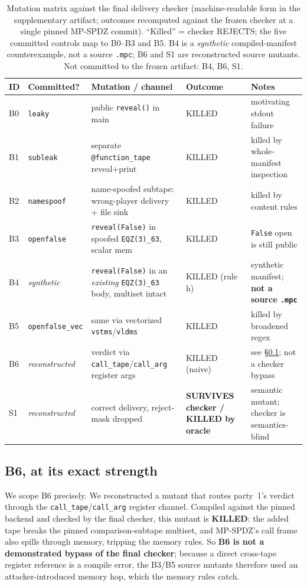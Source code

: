 \documentclass[conference]{IEEEtran}
\newcommand{\code}[1]{\texttt{\small #1}}
\newcommand{\calltape}{\code{call\_tape}}
\newcommand{\callarg}{\code{call\_arg}}
\begin{document}
\begin{table}[t]
\centering\footnotesize\renewcommand{\arraystretch}{1.25}
\caption{Mutation matrix against the final delivery checker (machine-readable form in the
supplementary artifact; outcomes recomputed against the frozen checker at a single pinned
MP-SPDZ commit). ``Killed'' = checker REJECTS; the five committed controls map to B0--B3
and B5. B4 is a \emph{synthetic} compiled-manifest counterexample, not a source
\code{.mpc}; B6 and S1 are reconstructed source mutants. Not committed to the frozen
artifact: B4, B6, S1.}
\label{tab:matrix}
\begin{tabularx}{\textwidth}{@{}l l X l X@{}}
\toprule
\textbf{ID} & \textbf{Committed?} & \textbf{Mutation / channel} & \textbf{Outcome} & \textbf{Notes} \\
\midrule
B0 & \code{leaky} & public \code{reveal()} in main & KILLED & motivating stdout failure \\
B1 & \code{subleak} & separate \code{@function\_tape} reveal+print & KILLED & killed by whole-manifest inspection \\
B2 & \code{namespoof} & name-spoofed subtape: wrong-player delivery + file sink & KILLED & killed by content rules \\
B3 & \code{openfalse} & \code{reveal(False)} in spoofed \code{EQZ(3)\_63}, scalar mem & KILLED & \code{False} open is still public \\
B4 & \emph{synthetic} & \code{reveal(False)} in an \emph{existing} \code{EQZ(3)\_63} body, multiset intact & KILLED (rule h) & synthetic manifest; \textbf{not a source \code{.mpc}} \\
B5 & \code{openfalse\_vec} & same via vectorized \code{vstms}/\code{vldms} & KILLED & killed by broadened regex \\
B6 & \emph{reconstructed} & verdict via \calltape/\callarg{} register args & KILLED (naive) & see \S\ref{sec:b6}; not a checker bypass \\
S1 & \emph{reconstructed} & correct delivery, reject-mask dropped & \textbf{SURVIVES checker / KILLED by oracle} & semantic mutant; checker is semantics-blind \\
\bottomrule
\end{tabularx}
\end{table}

\subsection{B6, at its exact strength}
\label{sec:b6}
We scope B6 precisely. We reconstructed a mutant that routes party~1's verdict through the
\calltape/\callarg{} register channel. Compiled against the pinned backend and checked by
the final checker, this mutant is \textbf{KILLED}: the added tape breaks the pinned
comparison-subtape multiset, and MP-SPDZ's call frame also spills through memory, tripping
the memory rules. So \textbf{B6 is not a demonstrated bypass of the final checker}; because
a direct cross-tape register reference is a compile error, the B3/B5 source mutants
therefore used an attacker-introduced memory hop, which the memory rules catch.
\end{document}
